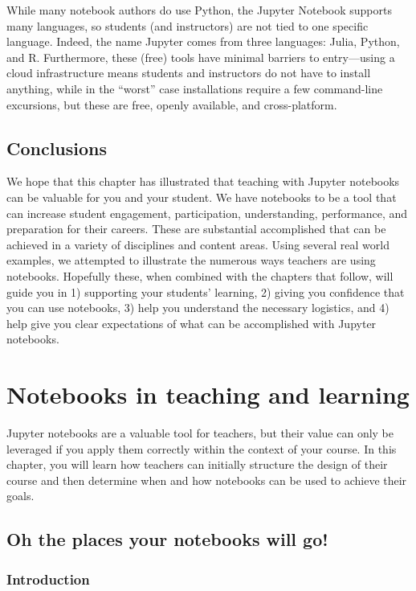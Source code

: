 \documentclass[]{book}
\begin{document}
While many notebook authors do use Python, the Jupyter Notebook supports
many languages, so students (and instructors) are not tied to one
specific language. Indeed, the name Jupyter comes from three languages:
Julia, Python, and R. Furthermore, these (free) tools have minimal
barriers to entry---using a cloud infrastructure means students and
instructors do not have to install anything, while in the ``worst'' case
installations require a few command-line excursions, but these are free,
openly available, and cross-platform.

\section{Conclusions}\label{conclusions}

We hope that this chapter has illustrated that teaching with Jupyter
notebooks can be valuable for you and your student. We have notebooks to
be a tool that can increase student engagement, participation,
understanding, performance, and preparation for their careers. These are
substantial accomplished that can be achieved in a variety of
disciplines and content areas. Using several real world examples, we
attempted to illustrate the numerous ways teachers are using notebooks.
Hopefully these, when combined with the chapters that follow, will guide
you in 1) supporting your students' learning, 2) giving you confidence
that you can use notebooks, 3) help you understand the necessary
logistics, and 4) help give you clear expectations of what can be
accomplished with Jupyter notebooks.

\chapter{Notebooks in teaching and
learning}\label{notebooks-in-teaching-and-learning}

Jupyter notebooks are a valuable tool for teachers, but their value can
only be leveraged if you apply them correctly within the context of your
course. In this chapter, you will learn how teachers can initially
structure the design of their course and then determine when and how
notebooks can be used to achieve their goals.

\section{Oh the places your notebooks will
go!}\label{oh-the-places-your-notebooks-will-go}

\subsection{Introduction}\label{introduction}
\end{document}
